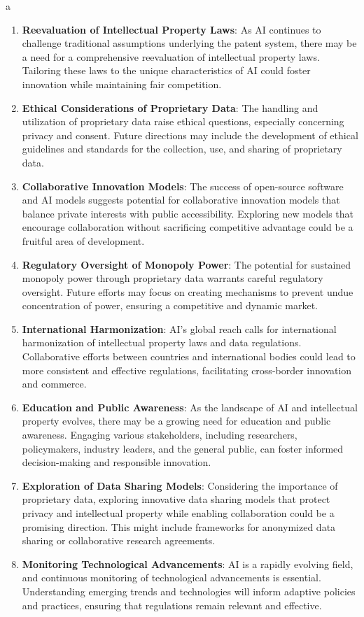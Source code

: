 a\documentclass{article}[10pt]
\begin{document}
\begin{enumerate}
	\item \textbf{Reevaluation of Intellectual Property Laws}: As AI continues to challenge traditional assumptions underlying the patent system, there may be a need for a comprehensive reevaluation of intellectual property laws. Tailoring these laws to the unique characteristics of AI could foster innovation while maintaining fair competition.
	\item \textbf{Ethical Considerations of Proprietary Data}: The handling and utilization of proprietary data raise ethical questions, especially concerning privacy and consent. Future directions may include the development of ethical guidelines and standards for the collection, use, and sharing of proprietary data.
	\item \textbf{Collaborative Innovation Models}: The success of open-source software and AI models suggests potential for collaborative innovation models that balance private interests with public accessibility. Exploring new models that encourage collaboration without sacrificing competitive advantage could be a fruitful area of development.
	\item \textbf{Regulatory Oversight of Monopoly Power}: The potential for sustained monopoly power through proprietary data warrants careful regulatory oversight. Future efforts may focus on creating mechanisms to prevent undue concentration of power, ensuring a competitive and dynamic market.
	\item \textbf{International Harmonization}: AI's global reach calls for international harmonization of intellectual property laws and data regulations. Collaborative efforts between countries and international bodies could lead to more consistent and effective regulations, facilitating cross-border innovation and commerce.
	\item \textbf{Education and Public Awareness}: As the landscape of AI and intellectual property evolves, there may be a growing need for education and public awareness. Engaging various stakeholders, including researchers, policymakers, industry leaders, and the general public, can foster informed decision-making and responsible innovation.
	\item \textbf{Exploration of Data Sharing Models}: Considering the importance of proprietary data, exploring innovative data sharing models that protect privacy and intellectual property while enabling collaboration could be a promising direction. This might include frameworks for anonymized data sharing or collaborative research agreements.
	\item \textbf{Monitoring Technological Advancements}: AI is a rapidly evolving field, and continuous monitoring of technological advancements is essential. Understanding emerging trends and technologies will inform adaptive policies and practices, ensuring that regulations remain relevant and effective.
\end{enumerate}
\end{document}
